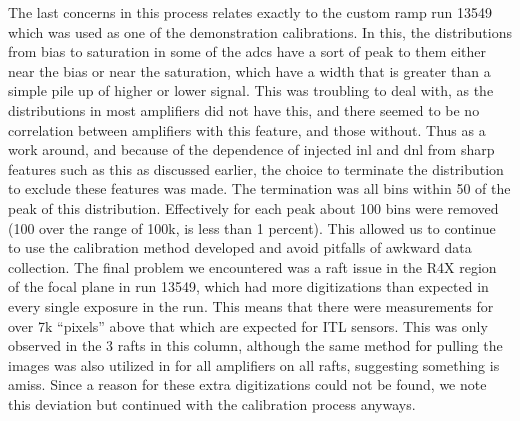 \documentclass[11pt, letterpaper]{article}
\begin{document}
The last concerns in this process relates exactly to the custom ramp run 13549 which was used as one of the demonstration calibrations. In this, the distributions from bias to saturation in some of the adcs have a sort of peak to them either near the bias or near the saturation, which have a width that is greater than a simple pile up of higher or lower signal. This was troubling to deal with, as the distributions in most amplifiers did not have this, and there seemed to be no correlation between amplifiers with this feature, and those without. Thus as a work around, and because of the dependence of injected inl and dnl from sharp features such as this as discussed earlier, the choice to terminate the distribution to exclude these features was made. The termination was all bins within 50 of the peak of this distribution. Effectively for each peak about 100 bins were removed (100 over the range of 100k, is less than 1 percent). This allowed us to continue to use the calibration method developed and avoid pitfalls of awkward data collection. 
The final problem we encountered was a raft issue in the R4X region of the focal plane in run 13549, which had more digitizations than expected in every single exposure in the run. This means that there were measurements for over 7k “pixels” above that which are expected for ITL sensors. This was only observed in the 3 rafts in this column, although the same method for pulling the images was also utilized in for all amplifiers on all rafts, suggesting something is amiss. Since a reason for these extra digitizations could not be found, we note this deviation but continued with the calibration process anyways. 
\end{document}
